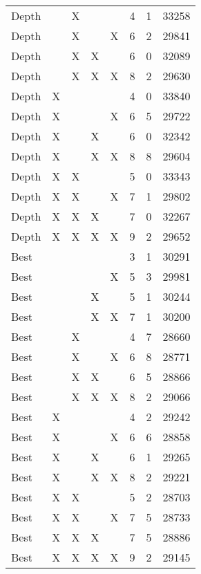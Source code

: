 \begin{tabular}{lllllrrr}
   Depth &    &  X &    &    &        4 &       1 &      33258 \\
   Depth &    &  X &    &  X &        6 &       2 &      29841 \\
   Depth &    &  X &  X &    &        6 &       0 &      32089 \\
   Depth &    &  X &  X &  X &        8 &       2 &      29630 \\
   Depth &  X &    &    &    &        4 &       0 &      33840 \\
   Depth &  X &    &    &  X &        6 &       5 &      29722 \\
   Depth &  X &    &  X &    &        6 &       0 &      32342 \\
   Depth &  X &    &  X &  X &        8 &       8 &      29604 \\
   Depth &  X &  X &    &    &        5 &       0 &      33343 \\
   Depth &  X &  X &    &  X &        7 &       1 &      29802 \\
   Depth &  X &  X &  X &    &        7 &       0 &      32267 \\
   Depth &  X &  X &  X &  X &        9 &       2 &      29652 \\
    Best &    &    &    &    &        3 &       1 &      30291 \\
    Best &    &    &    &  X &        5 &       3 &      29981 \\
    Best &    &    &  X &    &        5 &       1 &      30244 \\
    Best &    &    &  X &  X &        7 &       1 &      30200 \\
    Best &    &  X &    &    &        4 &       7 &      28660 \\
    Best &    &  X &    &  X &        6 &       8 &      28771 \\
    Best &    &  X &  X &    &        6 &       5 &      28866 \\
    Best &    &  X &  X &  X &        8 &       2 &      29066 \\
    Best &  X &    &    &    &        4 &       2 &      29242 \\
    Best &  X &    &    &  X &        6 &       6 &      28858 \\
    Best &  X &    &  X &    &        6 &       1 &      29265 \\
    Best &  X &    &  X &  X &        8 &       2 &      29221 \\
    Best &  X &  X &    &    &        5 &       2 &      28703 \\
    Best &  X &  X &    &  X &        7 &       5 &      28733 \\
    Best &  X &  X &  X &    &        7 &       5 &      28886 \\
    Best &  X &  X &  X &  X &        9 &       2 &      29145 \\
\bottomrule
\end{tabular}
\unskip